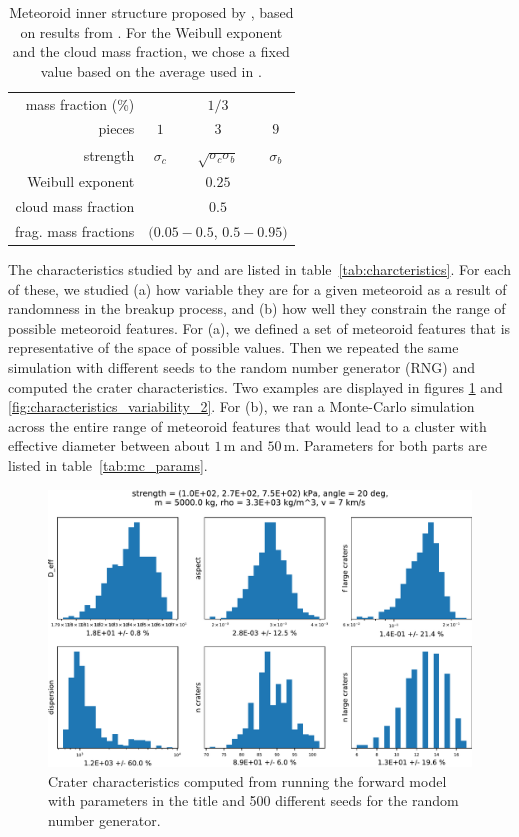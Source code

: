 \begin{table}[htbp]
    \centering
    \begin{tabular}{r|ccc}
        mass fraction (\%) & & $1/3$ \\
        pieces & $1$ & $3$ & $9$ \\
        strength & $\sigma_c$ & $\sqrt{\sigma_c\sigma_b}$ & $\sigma_b$ \\
        Weibull exponent & & $0.25$ \\
        cloud mass fraction & & $0.5$ \\
        frag. mass fractions & \multicolumn{3}{c}{$(0.05 - 0.5$, $0.5 - 0.95)$}
    \end{tabular}
    \caption{Meteoroid inner structure proposed by \cite{newland2019CFM18}, based on results from \cite{wheeler2018atmospheric}. For the Weibull exponent and the cloud mass fraction, we chose a fixed value based on the average used in \cite{wheeler2018atmospheric}.}
    \label{tab:eric_inner_structure}
\end{table}

The characteristics studied by \cite{daubar2019recently} and \cite{newland2019CFM18} are listed in table~\ref{tab:charcteristics}. For each of these, we studied (a) how variable they are for a given meteoroid as a result of randomness in the breakup process, and (b) how well they constrain the range of possible meteoroid features.
For (a), we defined a set of meteoroid features that is representative of the space of possible values.
Then we repeated the same simulation with different seeds to the random number generator (RNG) and computed the crater characteristics. Two examples are displayed in figures \ref{fig:characteristics_variability_1} and \ref{fig:characteristics_variability_2}.
For (b), we ran a Monte-Carlo simulation across the entire range of meteoroid features that would lead to a cluster with effective diameter between about $1\,\mathrm{m}$ and $50\,\mathrm{m}$.
Parameters for both parts are listed in table~\ref{tab:mc_params}.

\begin{figure}
    \centering
    \includegraphics[width=\textwidth]{figures/crater_tools_analysis_1}
    \caption{Crater characteristics computed from running the forward model with parameters in the title and 500 different seeds for the random number generator.}
    \label{fig:characteristics_variability_1}
\end{figure}

